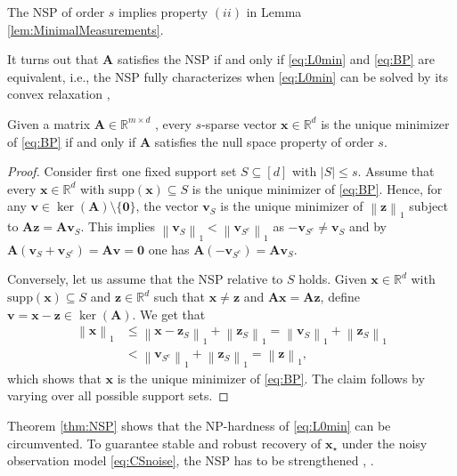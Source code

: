 \documentclass{svproc}
\newcommand{\bA}{\boldsymbol{A}}
\newcommand{\bv}{\boldsymbol{v}}
\newcommand{\bx}{\boldsymbol{x}}
\newcommand{\bz}{\boldsymbol{z}}
\newcommand{\0}{\boldsymbol{0}}
\newcommand{\1}{\boldsymbol{1}}
\renewcommand{\subset}{\subseteq}
\def\supp{\mathrm{supp}}
\def\R{\mathbb{R}}
\newcommand{\pnorm}[2]{\left\| #1 \right\|_{#2}}
\begin{document}
\begin{remark}
    The NSP of order $s$ implies property $(ii)$ in Lemma \ref{lem:MinimalMeasurements}.
\end{remark}

It turns out that $\bA$ satisfies the NSP if and only if \eqref{eq:L0min} and \eqref{eq:BP} are equivalent, i.e., the NSP fully characterizes when \eqref{eq:L0min} can be solved by its convex relaxation \cite{codade09,grni07},  \cite[Theorem 4.5]{foucart2013mathematical}

\begin{theorem}
\label{thm:NSP}
	Given a matrix $\bA \in \R^{m\times d}$ , every $s$-sparse vector $\bx \in \R^d$ is the unique minimizer of \eqref{eq:BP} if and only if $\bA$ satisfies the null space property of order $s$.
\end{theorem}

\begin{proof}
    Consider first one fixed support set $S \subset [d]$ with $|S| \le s$. Assume that every $\bx \in \R^d$ with $\supp(\bx) \subset S$ is the unique minimizer of \eqref{eq:BP}. Hence, for any $\bv \in \ker(\bA) \setminus \{ \0 \}$, the vector $\bv_S$ is the unique minimizer of $\pnorm{\bz}{1}$ subject to $\bA\bz = \bA\bv_S$. This implies $\pnorm{\bv_S}{1} < \pnorm{\bv_{S^c}}{1}$ as $-\bv_{S^c} \neq \bv_S$ and by $\bA(\bv_S + \bv_{S^c}) = \bA\bv = \0$ one has $\bA(-\bv_{S^c}) = \bA\bv_S$.
    
    Conversely, let us assume that the NSP relative to $S$ holds. Given $\bx \in \R^d$ with $\supp(\bx) \subset S$ and $\bz \in \R^d$ such that $\bx \neq \bz$ and $\bA\bx = \bA\bz$, define $\bv = \bx - \bz \in \ker(\bA)$. We get that
    \begin{align*}
        \pnorm{\bx}{1} &\le \pnorm{\bx - \bz_S}{1} + \pnorm{\bz_S}{1} = \pnorm{\bv_S}{1} + \pnorm{\bz_S}{1} \\
        &< \pnorm{\bv_{S^c}}{1} + \pnorm{\bz_S}{1} = \pnorm{\bz}{1},
    \end{align*}
    which shows that $\bx$ is the unique minimizer of \eqref{eq:BP}. The claim follows by varying over all possible support sets.
\end{proof}

Theorem \ref{thm:NSP} shows that the NP-hardness of \eqref{eq:L0min} can be circumvented. To guarantee stable and robust recovery of $\bx_\star$ under the noisy observation model \eqref{eq:CSnoise}, the NSP has to be strengthened \cite{grni07,codade09}, \cite[Definition 4.17]{foucart2013mathematical}.
\end{document}
